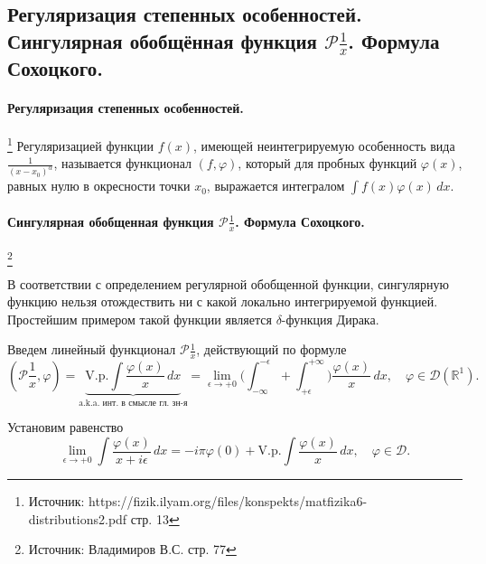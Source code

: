 \subsection{Регуляризация степенных особенностей. Сингулярная обобщённая функция $\mathcal{P} \frac{1}{x}$. Формула Сохоцкого.}

\paragraph{Регуляризация степенных особенностей.}\footnote{Источник: https://fizik.ilyam.org/files/konspekts/matfizika6-distributions2.pdf стр. 13} Регуляризацией функции $f(x)$, имеющей неинтегрируемую особенность вида $\frac{1}{(x - x_0)^{\alpha}}$, называется функционал $(f, \varphi)$, который для пробных функций $\varphi(x)$, равных нулю в окресности точки $x_0$, выражается интегралом $\int f(x) \varphi(x) \, dx$.

\paragraph{Сингулярная обобщенная функция $\mathcal{P}{\frac{1}{x}}$. Формула Сохоцкого.} \footnote{Источник: Владимиров В.С. стр. 77}

В соответствии с определением регулярной обобщенной функции, сингулярную функцию нельзя отождествить ни с какой локально интегрируемой функцией. Простейшим примером такой функции является $\delta$-функция Дирака.

Введем линейный функционал $\mathcal{P}{\frac{1}{x}}$, действующий по формуле
\begin{equation*}
	(\mathcal{P}{\frac{1}{x}}, \varphi) = \underbrace{\text{V.p.} \int \frac{\varphi(x)}{x} \, dx}_{\text{a.k.a. инт. в смысле гл. зн-я}} = 
	\lim \limits_{\epsilon \to +0} \Big(\int_{-\infty}^{-\epsilon} + \int_{+\epsilon}^{+\infty}\Big) \frac{\varphi(x)}{x} \, dx, \quad \varphi \in \mathcal{D}(\mathbb{R}^1).
\end{equation*} 

Установим равенство
\begin{equation}
	\label{huinya_s_potolka}
	\lim \limits_{\epsilon \to +0} \int \frac{\varphi(x)}{x + i \epsilon} \, dx = - i \pi \varphi(0) + \text{V.p.} \int \frac{\varphi(x)}{x} \, dx, \quad \varphi \in \mathcal{D}.
\end{equation}

